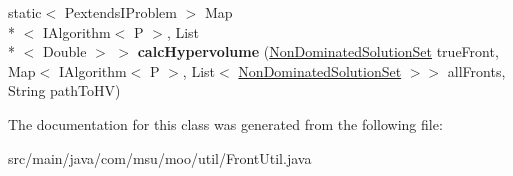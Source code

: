 \begin{DoxyCompactItemize}
\item 
\hypertarget{classcom_1_1msu_1_1moo_1_1util_1_1FrontUtil_aa26ee0f69a08dcd6026bd27c6194e214}{static$<$ Pextends\-I\-Problem $>$ Map\\*
$<$ I\-Algorithm$<$ P $>$, List\\*
$<$ Double $>$ $>$ {\bfseries calc\-Hypervolume} (\hyperlink{classcom_1_1msu_1_1moo_1_1model_1_1solution_1_1NonDominatedSolutionSet}{Non\-Dominated\-Solution\-Set} true\-Front, Map$<$ I\-Algorithm$<$ P $>$, List$<$ \hyperlink{classcom_1_1msu_1_1moo_1_1model_1_1solution_1_1NonDominatedSolutionSet}{Non\-Dominated\-Solution\-Set} $>$$>$ all\-Fronts, String path\-To\-H\-V)}\label{classcom_1_1msu_1_1moo_1_1util_1_1FrontUtil_aa26ee0f69a08dcd6026bd27c6194e214}

\end{DoxyCompactItemize}


The documentation for this class was generated from the following file\-:\begin{DoxyCompactItemize}
\item 
src/main/java/com/msu/moo/util/Front\-Util.\-java\end{DoxyCompactItemize}
